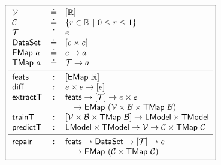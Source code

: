 \begin{figure}
\small
\begin{minipage}[c]{\linewidth}
  \lstDeleteShortInline{|}
  \[
  \boxed{
  \begin{array}{lcl}
    \V           & \defeq & \List{\R}\\
    \Runit       & \defeq & \{r \in \R\ |\ 0 \le r \le 1\} \\
    \T           & \defeq & e \\
    \Dataset     & \defeq & \List{e \times e} \\
    \Emap{a}     & \defeq & e \to a \\
    \Tmap{a}     & \defeq & \T \to a \\
    \midrule
    \featuresym  & : & \List{\Emap{\R}} \\
    \diffsym     & : & e \times e \to \List{e} \\
    \extractTsym & : & \featuresym \to \List{\T} \to e \times e \\
                 &   & \quad \to \Emap{(\V \times \B \times \Tmap{\B})} \\
    \trainTsym   & : & \List{\V \times \B \times \Tmap{\B}} \to \Model \times \ModelT \\
    \predictTsym & : & \Model \times \ModelT \to \V \to \Runit \times \Tmap{\Runit} \\
    \midrule
    \repairsym   & : & \featuresym \to \Dataset \to \List{\T} \to e \\
                 &   & \quad \to \Emap{(\Runit \times \Tmap{\Runit})}
  \end{array}
  }
  \]
  \lstMakeShortInline[mathescape=true]{|}
  \label{fig:api}
\end{minipage}
\end{figure}

